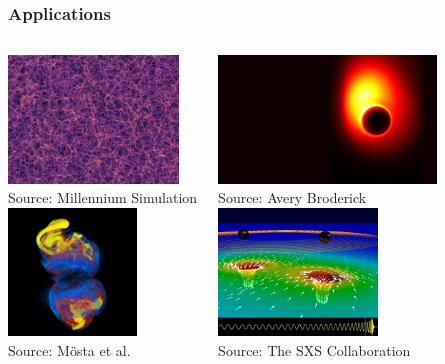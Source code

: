\documentclass[]{beamer}
\begin{document}
\begin{frame}
  \frametitle{Applications}
  \begin{columns}
    \column{6cm}
     \begin{center}
       \includegraphics[height=3.4cm]{figures/millennium_many_body}\\
       {\footnotesize Source: Millennium Simulation}\\
       \vspace{0.2cm}
       \includegraphics[height=3.4cm]{figures/Beta_volren_0123_small}\\
       {\footnotesize Source: M\"{o}sta et al.}
       \vspace{0.1cm}
     \end{center}
     \column{6cm}
     \begin{center}
       \includegraphics[height=3.4cm]{figures/black-hole-shadow}\\
       {\footnotesize Source: Avery Broderick}\\
       \vspace{0.2cm}
       \includegraphics[height=3.4cm]{figures/bbh_sxs}\\
       {\footnotesize Source: The SXS Collaboration}
       \vspace{0.1cm}
     \end{center}
  \end{columns}
\end{frame}
\end{document}
